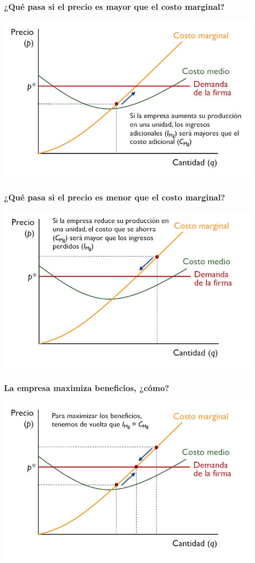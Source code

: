 \documentclass{beamer}
\begin{document}
\begin{frame}
\frametitle{¿Qué pasa si el precio es mayor que el costo marginal?}
\includegraphics[scale=0.55]{Slides Principios de Economia/Figures/Tema_07.8_compperfecta2.jpg}
\end{frame}

\begin{frame}
\frametitle{¿Qué pasa si el precio es menor que el costo marginal?}
\includegraphics[scale=0.55]{Slides Principios de Economia/Figures/Tema_07.9_compperfecta3.jpg}
\end{frame}

\begin{frame}
\frametitle{La empresa maximiza beneficios, ¿cómo?}
\includegraphics[scale=0.55]{Slides Principios de Economia/Figures/Tema_07.10_compperfecta4.jpg}
\end{frame}
\end{document}
